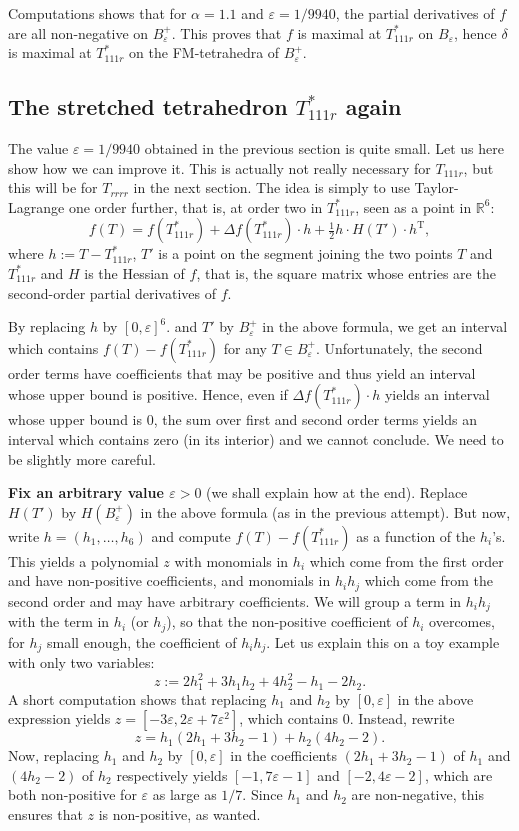 \documentclass[11pt]{article}
\begin{document}
Computations shows that for $\alpha=1.1$ and $\varepsilon=1/9940$, the partial derivatives of $f$ are all non-negative on $B^+_\varepsilon$.
This proves that $f$ is maximal at $T_{111r}^*$ on $B_\varepsilon$, hence $\delta$ is maximal at $T_{111r}^*$ on the FM-tetrahedra of $B^+_\varepsilon$.

\subsection{The stretched tetrahedron $T_{111r}^*$ again}
\label{sec:T111r_order2}

The value $\varepsilon=1/9940$ obtained in the previous section is quite small.
Let us here show how we can improve it.
This is actually not really necessary for $T_{111r}$, but this will be for $T_{rrrr}$ in the next section.
The idea is simply to use Taylor-Lagrange one order further, that is, at order two in $T^*_{111r}$, seen as a point in $\mathbb{R}^6$:
\[
f(T)=f(T_{111r}^*)+\Delta f(T_{111r}^*)\cdotp h + \tfrac{1}{2}h\cdotp H(T') \cdotp h^\mathrm{T},
\]
where $h:=T-T^*_{111r}$, $T'$ is a point on the segment joining the two points $T$ and $T^*_{111r}$ and $H$ is the Hessian of $f$, that is, the square matrix whose entries are the second-order partial derivatives of $f$.

By replacing $h$ by $[0,\varepsilon]^6$. and $T'$ by $B^+_\varepsilon$ in the above formula, we get an interval which contains $f(T)-f(T_{111r}^*)$ for any $T\in B^+_\varepsilon$.
Unfortunately, the second order terms have coefficients that may be positive and thus yield an interval whose upper bound is positive.
Hence, even if $\Delta f(T_{111r}^*)\cdotp h$ yields an interval whose upper bound is $0$, the sum over first and second order terms yields an interval which contains zero (in its interior) and we cannot conclude.
We need to be slightly more careful.

{\bf Fix an arbitrary value $\varepsilon>0$} (we shall explain how at the end).
Replace $H(T')$ by $H(B^+_\varepsilon)$ in the above formula (as in the previous attempt).
But now, write $h=(h_1,\ldots,h_6)$ and compute $f(T)-f(T_{111r}^*)$ as a function of the $h_i$'s.
This yields a polynomial $z$ with monomials in $h_i$ which come from the first order and have non-positive coefficients, and monomials in $h_ih_j$ which come from the second order and may have arbitrary coefficients.
We will group a term in $h_ih_j$ with the term in $h_i$ (or $h_j$), so that the non-positive coefficient of $h_i$ overcomes, for $h_j$ small enough, the coefficient of $h_ih_j$.
Let us explain this on a toy example with only two variables:
\[
z:=2h_1^2+3h_1h_2+4h_2^2-h_1-2h_2.
\]
A short computation shows that replacing $h_1$ and $h_2$ by $[0,\varepsilon]$ in the above expression yields $z=[-3\varepsilon, 2\varepsilon+7\varepsilon^2]$, which contains $0$.
Instead, rewrite
\[
z=h_1(2h_1+3h_2-1)+h_2(4h_2-2).
\]
Now, replacing $h_1$ and $h_2$ by $[0,\varepsilon]$ in the coefficients $(2h_1+3h_2-1)$ of $h_1$ and $(4h_2-2)$ of $h_2$ respectively yields $[-1,7\varepsilon-1]$ and $[-2,4\varepsilon-2]$, which are both non-positive for $\varepsilon$ as large as $1/7$.
Since $h_1$ and $h_2$ are non-negative, this ensures that $z$ is non-positive, as wanted.
\end{document}
